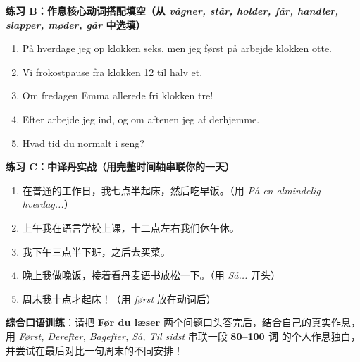 \textbf{练习 B：作息核心动词搭配填空（从 \textit{vågner, står, holder, får, handler, slapper, møder, går} 中选填）}
\begin{enumerate}
  \item På hverdage \underline{\hspace{2.0cm}} jeg op klokken seks, men jeg \underline{\hspace{2.0cm}} først på arbejde klokken otte.
  \item Vi \underline{\hspace{2.0cm}} frokostpause fra klokken 12 til halv et.
  \item Om fredagen \underline{\hspace{2.0cm}} Emma allerede fri klokken tre!
  \item Efter arbejde \underline{\hspace{2.0cm}} jeg ind, og om aftenen \underline{\hspace{2.0cm}} jeg af derhjemme.
  \item Hvad tid \underline{\hspace{2.0cm}} du normalt i seng?
\end{enumerate}

\textbf{练习 C：中译丹实战（用完整时间轴串联你的一天）}
\begin{enumerate}
  \item 在普通的工作日，我七点半起床，然后吃早饭。（用 \textit{På en almindelig hverdag...}）
  \item 上午我在语言学校上课，十二点左右我们休午休。
  \item 我下午三点半下班，之后去买菜。
  \item 晚上我做晚饭，接着看丹麦语书放松一下。（用 \textit{Så...} 开头）
  \item 周末我十点才起床！（用 \textit{først} 放在动词后）
\end{enumerate}


\textbf{综合口语训练}：请把 \textbf{Før du læser} 两个问题口头答完后，结合自己的真实作息，用 \textit{Først, Derefter, Bagefter, Så, Til sidst} 串联一段 \textbf{80--100 词} 的个人作息独白，并尝试在最后对比一句周末的不同安排！

